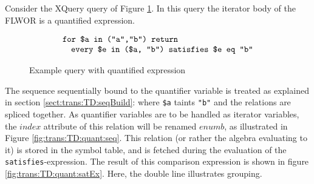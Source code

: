 \begin{myExample}
Consider the XQuery query of Figure \ref{fig:trans:TD:quantQu}. In this query the iterator body of the FLWOR is a
quantified expression.
\begin{figure}[h]
\begin{equation*}
\begin{array}{l}
\mbox{\texttt{for \$a in ("a","b") return}} \\ \quad
\mbox{\texttt{every \$e in (\$a, "b") satisfies \$e eq "b"}}
\end{array}
\end{equation*}
\caption{Example query with quantified expression \label{fig:trans:TD:quantQu}}
\end{figure}

The sequence sequentially bound to the quantifier variable is treated as explained in section
\ref{sect:trans:TD:seqBuild}: where \texttt{\$a} taints \texttt{"b"} and the relations are spliced together. As
quantifier variables are to be handled as iterator variables, the $index$ attribute of this relation will be
renamed $enumb$, as illustrated in Figure \ref{fig:trans:TD:quant:seq}. This relation (or rather the algebra
evaluating to it) is stored in the symbol table, and is fetched during the evaluation of the
\texttt{satisfies}-expression. The result of this comparison expression is shown in figure
\ref{fig:trans:TD:quant:satEx}. Here, the double line illustrates grouping.

\begin{figure}[h]
\centering
{}
\qquad
{}
\qquad
{}


\end{figure}
\end{myExample}
